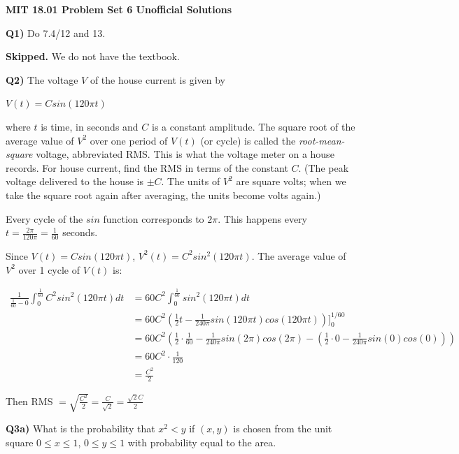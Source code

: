 \documentclass[9pt]{article}
\begin{document}
\begin{center}
  \large\textbf{MIT 18.01 Problem Set 6 Unofficial Solutions}
\end{center}

\begin{tcolorbox}
  \textbf{Q1)} Do 7.4/12 and 13.
\end{tcolorbox}

\textbf{Skipped.} We do not have the textbook.


\begin{tcolorbox}
  \textbf{Q2)} The voltage $V$ of the house current is given by\\
  \begin{center}
    $V(t) = Csin(120\pi t)$
  \end{center}
  where $t$ is time, in seconds and $C$ is a constant amplitude. The square root of the average value of $V^2$ over one period of $V(t)$ (or cycle) is called the \emph{root-mean-square} voltage, abbreviated RMS. This is what the voltage meter on a house records. For house current, find the RMS in terms of the constant $C$. (The peak voltage delivered to the house is $\pm C$. The units of $V^2$ are square volts; when we take the square root again after averaging, the units become volts again.)
\end{tcolorbox}

Every cycle of the $sin$ function corresponds to $2 \pi$. This happens every $t = \frac{2 \pi}{120 \pi} = \frac{1}{60}$ seconds.

Since $V(t) = Csin(120\pi t)$, $V^2(t) = C^2 sin^2(120\pi t)$. The average value of $V^2$ over 1 cycle of $V(t)$ is:

\begin{align*}
  \frac{1}{\frac{1}{60} - 0} \int_0^{\frac{1}{60}} C^2 sin^2(120\pi t) dt &= 60C^2 \int_0^{\frac{1}{60}} sin^2(120\pi t) dt \\
  &= 60C^2(\frac{1}{2}t - \frac{1}{240\pi} sin(120\pi t) cos(120\pi t)) \bigg]_0^{1/60} \\
  &= 60C^2(\frac{1}{2} \cdot \frac{1}{60} - \frac{1}{240\pi} sin(2\pi) cos(2\pi) - (\frac{1}{2} \cdot 0 - \frac{1}{240\pi} sin(0) cos(0))) \\
  &= 60C^2 \cdot \frac{1}{120} \\
  &= \frac{C^2}{2}
\end{align*}

Then RMS $= \sqrt{\frac{C^2}{2}} = \frac{C}{\sqrt{2}} = \frac{\sqrt{2}C}{2}$


\begin{tcolorbox}
  \textbf{Q3a)} What is the probability that $x^2 < y$ if $(x, y)$ is chosen from the unit square $0 \leq x \leq 1$, $0 \leq y \leq 1$ with probability equal to the area.
\end{tcolorbox}
\end{document}
